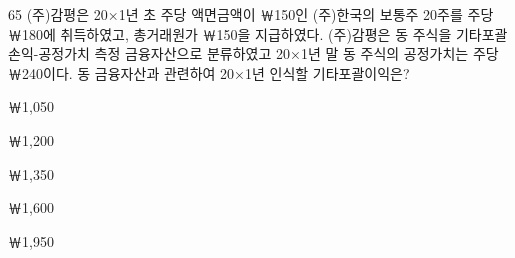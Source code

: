 \begin{question}{65}
(주)감평은 20×1년 초 주당 액면금액이 ￦150인 (주)한국의 보통주 20주를 주당 ￦180에 취득하였고, 총거래원가 ￦150을 지급하였다. (주)감평은 동 주식을 기타포괄손익-공정가치 측정 금융자산으로 분류하였고 20×1년 말 동 주식의 공정가치는 주당 ￦240이다. 동 금융자산과 관련하여 20×1년 인식할 기타포괄이익은?
\begin{choices}
  \item ￦1,050
  \item ￦1,200
  \item ￦1,350
  \item ￦1,600
  \item ￦1,950
\end{choices}
\end{question}
